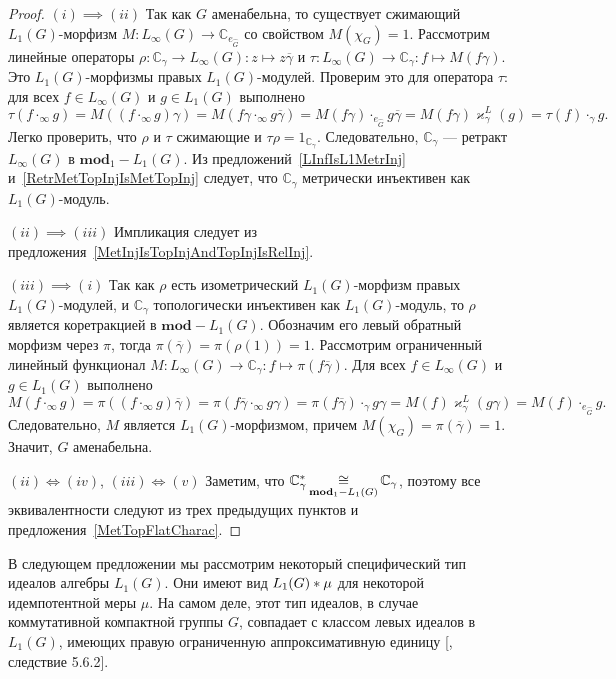\begin{proof} 
$(i) \implies (ii)$ Так как $G$ аменабельна, то существует сжимающий
$L_1(G)$-морфизм $M:L_\infty(G)\to\mathbb{C}_{e_{\widehat{G}}}$ со свойством
$M(\chi_G)=1$. Рассмотрим линейные операторы 
$\rho:\mathbb{C}_\gamma\to L_\infty(G):z\mapsto z\overline{\gamma}$ и
$\tau:L_\infty(G)\to\mathbb{C}_\gamma:f\mapsto M(f\gamma)$. Это
$L_1(G)$-морфизмы  правых $L_1(G)$-модулей. Проверим это для оператора 
$\tau$: для всех $f\in L_\infty(G)$ и $g\in L_1(G)$ выполнено
$$
\tau(f\cdot_\infty g)
=M((f\cdot_\infty g)\gamma)
=M(f\gamma\cdot_\infty g\overline{\gamma})
=M(f\gamma)\cdot_{e_{\widehat{G}}} g\overline{\gamma}
=M(f\gamma)\varkappa_\gamma^L(g)
=\tau(f)\cdot_{\gamma} g.
$$  
Легко проверить, что $\rho$ и $\tau$ сжимающие и
$\tau\rho=1_{\mathbb{C}_\gamma}$. Следовательно, $\mathbb{C}_\gamma$ --- ретракт
$L_\infty(G)$ в $\mathbf{mod}_1-L_1(G)$. Из предложений~\ref{LInfIsL1MetrInj}
и~\ref{RetrMetTopInjIsMetTopInj} следует, что $\mathbb{C}_\gamma$ метрически
инъективен как $L_1(G)$-модуль.

$(ii) \implies (iii)$ Импликация следует из
предложения~\ref{MetInjIsTopInjAndTopInjIsRelInj}.

$(iii) \implies (i)$ Так как $\rho$ есть изометрический $L_1(G)$-морфизм
правых $L_1(G)$-модулей, и $\mathbb{C}_\gamma$ топологически инъективен как
$L_1(G)$-модуль, то $\rho$ является коретракцией в $\mathbf{mod}-L_1(G)$.
Обозначим его левый обратный морфизм через $\pi$, тогда
$\pi(\overline{\gamma})=\pi(\rho(1))=1$. Рассмотрим ограниченный линейный
функционал $M:L_\infty(G)\to\mathbb{C}_\gamma:f\mapsto \pi(f\overline{\gamma})$.
Для всех $f\in L_\infty(G)$ и $g\in L_1(G)$ выполнено
$$
M(f\cdot_\infty g)
=\pi((f\cdot_\infty g)\overline{\gamma})
=\pi(f\overline{\gamma}\cdot_\infty g\gamma)
=\pi(f\overline{\gamma})\cdot_{\gamma} g\gamma
=M(f)\varkappa_\gamma^L(g\gamma)
=M(f)\cdot_{e_{\widehat{G}}}g.
$$
Следовательно, $M$ является $L_1(G)$-морфизмом, причем
$M(\chi_G)=\pi(\overline{\gamma})=1$. Значит, $G$ аменабельна.

$(ii) \Longleftrightarrow (iv)$, $(iii) \Longleftrightarrow (v)$ Заметим, что
$\mathbb{C}_\gamma^*\mathop{\mathbin{\cong}}\limits_{\mathbf{mod}_1-L_1(G)}\mathbb{C}_\gamma$, поэтому все
эквивалентности следуют из трех предыдущих пунктов и
предложения~\ref{MetTopFlatCharac}.
\end{proof}

В следующем предложении мы рассмотрим некоторый специфический тип идеалов
алгебры $L_1(G)$. Они имеют вид $L_1(G)\ast \mu$ для некоторой идемпотентной
меры $\mu$. На самом деле, этот тип идеалов, в случае коммутативной компактной
группы $G$, совпадает с классом левых идеалов в $L_1(G)$, имеющих правую
ограниченную аппроксимативную единицу [\cite{KaniBanAlg}, следствие 5.6.2].

